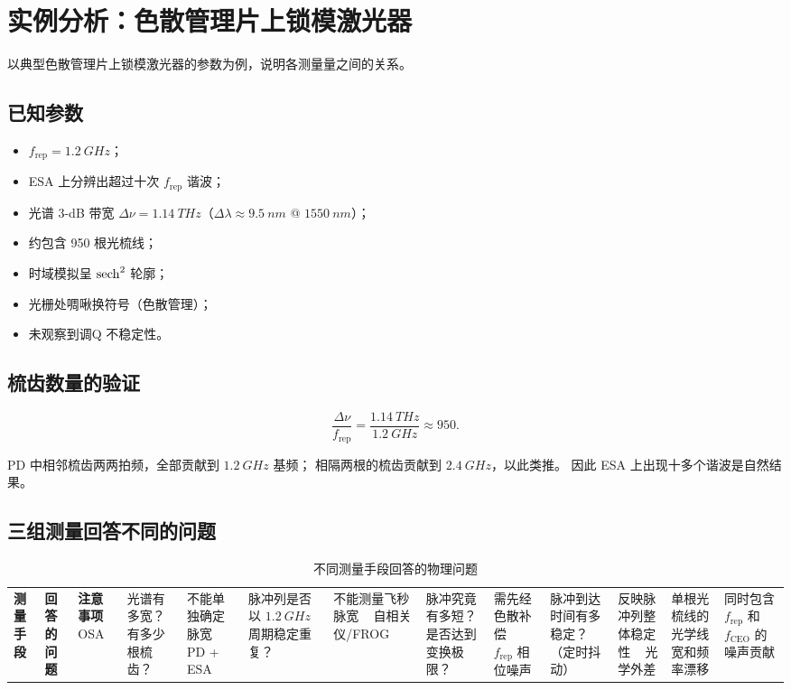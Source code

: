 \documentclass[11pt,a4paper]{article}
\newcommand{\rep}{f_{\text{rep}}}
\newcommand{\ceo}{f_{\text{CEO}}}
\begin{document}
\section{实例分析：色散管理片上锁模激光器}

以典型色散管理片上锁模激光器的参数为例，说明各测量量之间的关系。

\subsection{已知参数}

\begin{itemize}
    \item $\rep = \SI{1.2}{GHz}$；
    \item ESA 上分辨出超过十次 $\rep$ 谐波；
    \item 光谱 3-dB 带宽 $\Delta\nu = \SI{1.14}{THz}$（$\Delta\lambda \approx \SI{9.5}{nm}$ @ $\SI{1550}{nm}$）；
    \item 约包含 950 根光梳线；
    \item 时域模拟呈 $\sech^2$ 轮廓；
    \item 光栅处啁啾换符号（色散管理）；
    \item 未观察到调Q 不稳定性。
\end{itemize}

\subsection{梳齿数量的验证}

\begin{equation}\label{eq:comb_line_count}
\frac{\Delta\nu}{\rep} = \frac{\SI{1.14}{THz}}{\SI{1.2}{GHz}} \approx 950.
\end{equation}

PD 中相邻梳齿两两拍频，全部贡献到 $\SI{1.2}{GHz}$ 基频；
相隔两根的梳齿贡献到 $\SI{2.4}{GHz}$，以此类推。
因此 ESA 上出现十多个谐波是自然结果。

\subsection{三组测量回答不同的问题}

\begin{table}[htbp]
\centering
\caption{不同测量手段回答的物理问题}
\label{tab:measurements}
\renewcommand{\arraystretch}{1.5}
\begin{tabular}{@{}p{3.2cm} p{5.8cm} p{5.5cm}@{}}
\toprule
\textbf{测量手段} & \textbf{回答的问题} & \textbf{注意事项} \
\midrule
OSA & 光谱有多宽？有多少根梳齿？ & 不能单独确定脉宽 \
\hline
PD + ESA & 脉冲列是否以 $\SI{1.2}{GHz}$ 周期稳定重复？ & 不能测量飞秒脉宽 \
\hline
自相关仪/FROG & 脉冲究竟有多短？是否达到变换极限？ & 需先经色散补偿 \
\hline
$\rep$ 相位噪声 & 脉冲到达时间有多稳定？（定时抖动） & 反映脉冲列整体稳定性 \
\hline
光学外差 & 单根光梳线的光学线宽和频率漂移 & 同时包含 $\rep$ 和 $\ceo$ 的噪声贡献 \
\bottomrule
\end{tabular}
\end{table}
\end{document}
